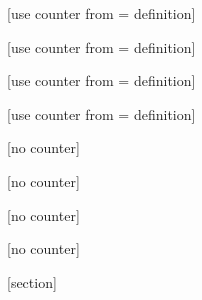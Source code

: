 
[use counter from = definition]%

[use counter from = definition]%

[use counter from = definition]%

[use counter from = definition]%


[no counter]

[no counter]

[no counter]

[no counter]

[section]
\setcounter{exer}{0}
\renewcommand{\theexer}{\thesection.\arabic{exer}}

\newenvironment{exercise}[1][]{
  \refstepcounter{exer}
  \par\noindent\makebox[-3pt][r]{
    \footnotesize\color{red!90}\HandPencilLeft\quad}
    \comicneueangular
    \textbf{\color{blue!90}{\exercisename} \theexer ~~ #1}}{
    \par\vspace{\stretch{1}}}
